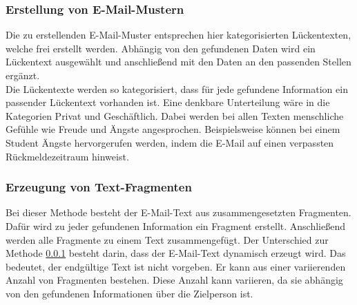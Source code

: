 		\subsubsection{Erstellung von E-Mail-Mustern}
		\label{subsubsec:EMailMusterMethode}
		Die zu erstellenden E-Mail-Muster entsprechen hier kategorisierten Lückentexten, welche frei erstellt werden. Abhängig von den gefundenen Daten wird ein Lückentext ausgewählt und anschließend mit den Daten an den passenden Stellen ergänzt.\\
		Die Lückentexte werden so kategorisiert, dass für jede gefundene Information ein passender Lückentext vorhanden ist. Eine denkbare Unterteilung wäre in die Kategorien Privat und Geschäftlich. Dabei werden bei allen Texten menschliche Gefühle wie Freude und Ängste angesprochen. Beispielsweise können bei einem Student Ängste hervorgerufen werden, indem die E-Mail auf einen verpassten Rückmeldezeitraum hinweist.
	
		\subsubsection{Erzeugung von Text-Fragmenten}
		\label{subsubsec:EMailTextFragment}
		Bei dieser Methode besteht der E-Mail-Text aus zusammengesetzten Fragmenten. Dafür wird zu jeder gefundenen Information ein Fragment erstellt. Anschließend werden alle Fragmente zu einem Text zusammengefügt. Der Unterschied zur Methode \ref{subsubsec:EMailMusterMethode} besteht darin, dass der E-Mail-Text dynamisch erzeugt wird. Das bedeutet, der endgültige Text ist nicht vorgeben. Er kann aus einer variierenden Anzahl von Fragmenten bestehen. Diese Anzahl kann variieren, da sie abhängig von den gefundenen Informationen über die Zielperson ist.
		
		
		
